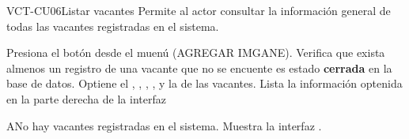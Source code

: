 \begin{UseCase}[]{VCT-CU06}{Listar vacantes}{
	Permite al actor consultar la información general de todas las vacantes registradas en el sistema.
	}
\end{UseCase}

\begin{UCtrayectoria}
	\UCpaso [\UCactor] Presiona el botón  desde el muenú (AGREGAR IMGANE).
    \UCpaso [\UCsist] Verifica que exista almenos un registro de una vacante que no se encuente es estado \textbf{cerrada} en la base de datos.
	\UCpaso [\UCsist] Optiene el , , 
	, , y la   de las vacantes.
	\UCpaso [\UCsist] Lista la información optenida en la parte derecha de la interfaz 
\end{UCtrayectoria}

\begin{UCtrayectoriaA}{A}{No hay vacantes registradas en el sistema.}
	\UCpaso [\UCsist] Muestra la interfaz .
\end{UCtrayectoriaA}

